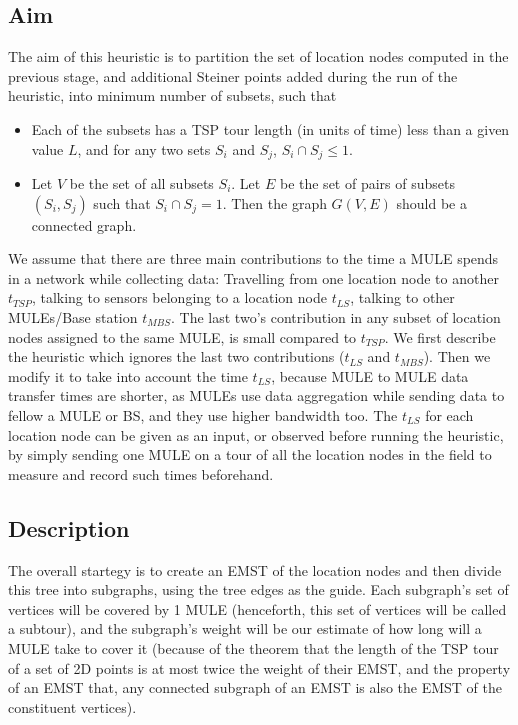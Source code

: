 \subsection{Aim}
The aim of this heuristic is to partition the set of location nodes computed in the previous stage, and additional Steiner points added during the run of the heuristic, into minimum number of subsets, such that

\begin{itemize}
\item Each of the subsets has a TSP tour length (in units of time) less than a given value $L$, and for any two sets $S_{i}$ and $S_{j}$, $S_{i} \cap S_{j} \le 1$.
\item Let $V$ be the set of all subsets $S_{i}$. Let $E$ be the set of pairs of subsets $(S_{i},S_{j})$ such that $S_{i} \cap S_{j} = 1$. Then the graph $G(V,E)$ should be a connected graph.
\end{itemize}

We assume that there are three main contributions to the time a MULE spends in a network while collecting data: Travelling from one location node to another $t_{TSP}$, talking to sensors belonging to a location node $t_{LS}$, talking to other MULEs/Base station $t_{MBS}$. The last two's contribution in any subset of location nodes assigned to the same MULE, is small compared to $t_{TSP}$. We first describe the heuristic which ignores the last two contributions ($t_{LS}$ and $t_{MBS}$). Then we modify it to take into account the time $t_{LS}$, because MULE to MULE data transfer times are shorter, as MULEs use data aggregation while sending data to fellow a MULE or BS, and they use higher bandwidth too. The $t_{LS}$ for each location node can be given as an input, or observed before running the heuristic, by simply sending one MULE on a tour of all the location nodes in the field to measure and record such times beforehand.



\subsection{Description}
The overall startegy is to create an EMST of the location nodes and then divide this tree into subgraphs, using the tree edges as the guide. Each subgraph's set of vertices will be covered by 1 MULE (henceforth, this set of vertices will be called a subtour), and the subgraph's weight will be our estimate of how long will a MULE take to cover it (because of the theorem that the length of the TSP tour of a set of 2D points is at most twice the weight of their EMST, and the property of an EMST that, any connected subgraph of an EMST is also the EMST of the constituent vertices).

